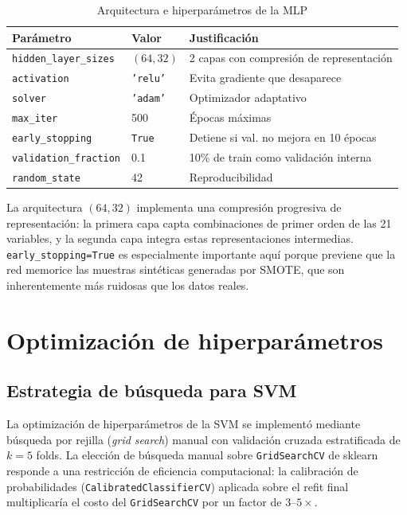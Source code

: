 \documentclass[12pt,a4paper]{article}
\begin{document}
\begin{table}[H]
  \centering
  \caption{Arquitectura e hiperparámetros de la MLP}
  \begin{tabular}{lll}
    \toprule
    \textbf{Parámetro} & \textbf{Valor} & \textbf{Justificación}\\
    \midrule
    \texttt{hidden\_layer\_sizes} & $(64, 32)$ & 2 capas con compresión de representación\\
    \texttt{activation} & \texttt{'relu'} & Evita gradiente que desaparece\\
    \texttt{solver} & \texttt{'adam'} & Optimizador adaptativo\\
    \texttt{max\_iter} & 500 & Épocas máximas\\
    \texttt{early\_stopping} & \texttt{True} & Detiene si val. no mejora en 10 épocas\\
    \texttt{validation\_fraction} & 0.1 & 10\% de train como validación interna\\
    \texttt{random\_state} & 42 & Reproducibilidad\\
    \bottomrule
  \end{tabular}
\end{table}

La arquitectura $(64, 32)$ implementa una compresión progresiva de representación: la primera capa capta combinaciones de primer orden de las 21 variables, y la segunda capa integra estas representaciones intermedias. \texttt{early\_stopping=True} es especialmente importante aquí porque previene que la red memorice las muestras sintéticas generadas por SMOTE, que son inherentemente más ruidosas que los datos reales.

\section{Optimización de hiperparámetros}

\subsection{Estrategia de búsqueda para SVM}

La optimización de hiperparámetros de la SVM se implementó mediante búsqueda por rejilla (\textit{grid search}) manual con validación cruzada estratificada de $k=5$ folds. La elección de búsqueda manual sobre \texttt{GridSearchCV} de sklearn responde a una restricción de eficiencia computacional: la calibración de probabilidades (\texttt{CalibratedClassifierCV}) aplicada sobre el refit final multiplicaría el costo del \texttt{GridSearchCV} por un factor de $3$--$5\times$.
\end{document}
